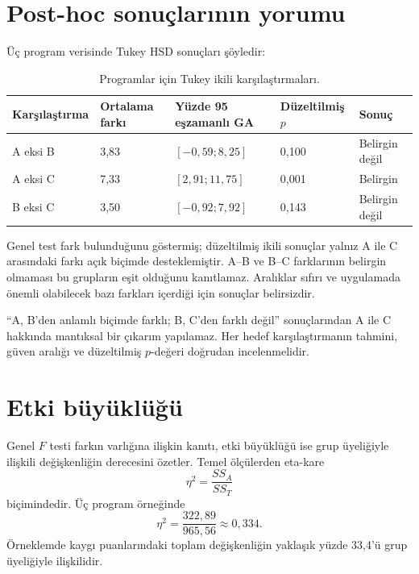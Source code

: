 \section{Post-hoc sonuçlarının yorumu}

Üç program verisinde Tukey HSD sonuçları şöyledir:

\begin{table}[htbp]
\centering
\caption{Programlar için Tukey ikili karşılaştırmaları.}
\begingroup\scriptsize
\begin{tabular}{@{}p{}p{}p{}p{}p{}@{}}
\toprule
Karşılaştırma & Ortalama farkı & Yüzde 95 eşzamanlı GA & Düzeltilmiş $p$ & Sonuç \\
\midrule
A eksi B & 3,83 & $[-0{,}59;8{,}25]$ & 0,100 & Belirgin değil \\
A eksi C & 7,33 & $[2{,}91;11{,}75]$ & 0,001 & Belirgin \\
B eksi C & 3,50 & $[-0{,}92;7{,}92]$ & 0,143 & Belirgin değil \\
\bottomrule
\end{tabular}
\endgroup
\end{table}

Genel test fark bulunduğunu göstermiş; düzeltilmiş ikili sonuçlar yalnız A ile
C arasındaki farkı açık biçimde desteklemiştir. A--B ve B--C farklarının
belirgin olmaması bu grupların eşit olduğunu kanıtlamaz. Aralıklar sıfırı ve
uygulamada önemli olabilecek bazı farkları içerdiği için sonuçlar belirsizdir.

\begin{mistakebox}
``A, B'den anlamlı biçimde farklı; B, C'den farklı değil'' sonuçlarından A ile
C hakkında mantıksal bir çıkarım yapılamaz. Her hedef karşılaştırmanın tahmini,
güven aralığı ve düzeltilmiş $p$-değeri doğrudan incelenmelidir.
\end{mistakebox}

\section{Etki büyüklüğü}

Genel $F$ testi farkın varlığına ilişkin kanıtı, etki büyüklüğü ise grup
üyeliğiyle ilişkili değişkenliğin derecesini özetler. Temel ölçülerden
eta-kare
\[
\eta^2=\frac{SS_A}{SS_T}
\]
biçimindedir. Üç program örneğinde
\[
\eta^2=\frac{322{,}89}{965{,}56}\approx0{,}334.
\]
Örneklemde kaygı puanlarındaki toplam değişkenliğin yaklaşık yüzde 33,4'ü grup
üyeliğiyle ilişkilidir.

